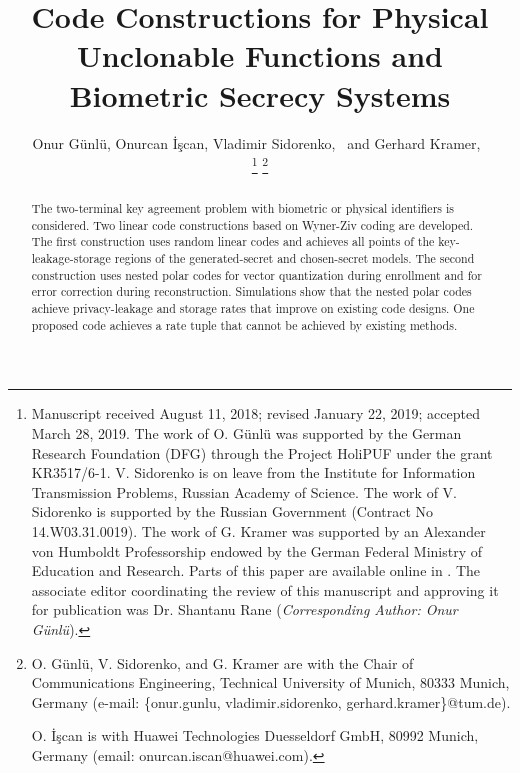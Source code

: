 \documentclass[journal,10pt,twoside]{IEEEtran}
\begin{document}
\title{Code Constructions for Physical Unclonable Functions and Biometric Secrecy Systems}
\IEEEoverridecommandlockouts

\author{Onur G\"unl\"u,	Onurcan \.{I}\c{s}can, Vladimir Sidorenko,~ and Gerhard Kramer,~
	
	\thanks{Manuscript received August 11, 2018; revised January 22, 2019; accepted March 28, 2019. The work of O. G\"unl\"u was supported by the German Research Foundation (DFG) through the Project HoliPUF under the grant KR3517/6-1. V. Sidorenko is on leave from the Institute for Information Transmission Problems, Russian Academy of Science. The work of V. Sidorenko is supported by the Russian Government (Contract No 14.W03.31.0019). The work of G. Kramer was supported by an Alexander von Humboldt Professorship endowed by the German Federal Ministry of Education and Research. Parts of this paper are available online in \cite{OurWZArxiv}. The associate editor coordinating the review of this manuscript and approving it for publication was Dr. Shantanu Rane (\textit{Corresponding Author: Onur G\"unl\"u}).}
	\thanks{O. G\"unl\"u, V. Sidorenko, and G. Kramer are with the Chair of Communications Engineering, Technical University of Munich, 80333 Munich, Germany (e-mail: \{onur.gunlu, vladimir.sidorenko, gerhard.kramer\}@tum.de).
		
	O. \.{I}\c{s}can is with Huawei Technologies Duesseldorf GmbH, 80992 Munich, Germany (email: onurcan.iscan@huawei.com).}
}
\maketitle




\begin{abstract}
The two-terminal key agreement problem with biometric or physical identifiers is considered. Two linear code constructions based on Wyner-Ziv coding are developed. The first construction uses random linear codes and achieves all points of the key-leakage-storage regions of the generated-secret and chosen-secret models. The second construction uses nested polar codes for vector quantization during enrollment and for error correction during reconstruction. Simulations show that the nested polar codes achieve privacy-leakage and storage rates that improve on existing code designs. One proposed code achieves a rate tuple that cannot be achieved by existing methods.
\end{abstract}
\end{document}
